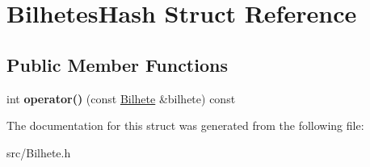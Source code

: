 \hypertarget{struct_bilhetes_hash}{}\section{Bilhetes\+Hash Struct Reference}
\label{struct_bilhetes_hash}
\subsection*{Public Member Functions}
\begin{DoxyCompactItemize}
\item 
\hypertarget{struct_bilhetes_hash_af462eb3ea69790f6e6eda47c32633e2f}{}int {\bfseries operator()} (const \hyperlink{class_bilhete}{Bilhete} \&bilhete) const \label{struct_bilhetes_hash_af462eb3ea69790f6e6eda47c32633e2f}

\end{DoxyCompactItemize}


The documentation for this struct was generated from the following file\+:\begin{DoxyCompactItemize}
\item 
src/Bilhete.\+h\end{DoxyCompactItemize}
